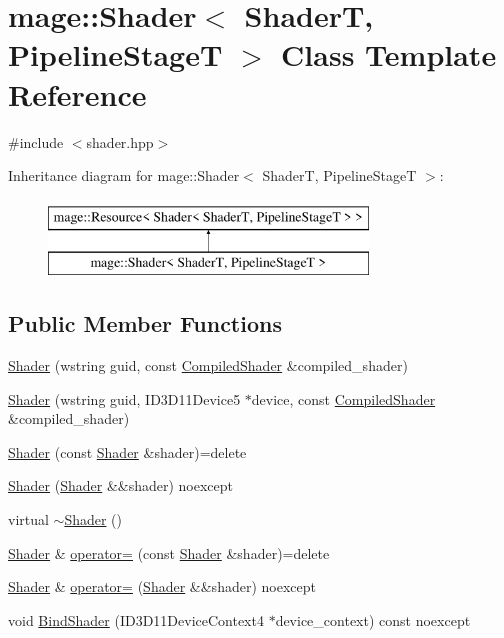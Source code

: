 \hypertarget{classmage_1_1_shader}{}\section{mage\+:\+:Shader$<$ ShaderT, Pipeline\+StageT $>$ Class Template Reference}
\label{classmage_1_1_shader}


{\ttfamily \#include $<$shader.\+hpp$>$}

Inheritance diagram for mage\+:\+:Shader$<$ ShaderT, Pipeline\+StageT $>$\+:\begin{figure}[H]
\begin{center}
\leavevmode
\includegraphics[height=2.000000cm]{classmage_1_1_shader}
\end{center}
\end{figure}
\subsection*{Public Member Functions}
\begin{DoxyCompactItemize}
\item 
\hyperlink{classmage_1_1_shader_a70caa62e6ea79bd63e2d825850c4d6dc}{Shader} (wstring guid, const \hyperlink{classmage_1_1_compiled_shader}{Compiled\+Shader} \&compiled\+\_\+shader)
\item 
\hyperlink{classmage_1_1_shader_a7f8d27e6e1e74e8aca55e854178dd0e5}{Shader} (wstring guid, I\+D3\+D11\+Device5 $\ast$device, const \hyperlink{classmage_1_1_compiled_shader}{Compiled\+Shader} \&compiled\+\_\+shader)
\item 
\hyperlink{classmage_1_1_shader_a22a14b034479acb369c32775bb6a7c09}{Shader} (const \hyperlink{classmage_1_1_shader}{Shader} \&shader)=delete
\item 
\hyperlink{classmage_1_1_shader_a2c4416258ff5d48ac6bc4a0269f20d78}{Shader} (\hyperlink{classmage_1_1_shader}{Shader} \&\&shader) noexcept
\item 
virtual \hyperlink{classmage_1_1_shader_a10a954f75331d93c9549b2db5a2c838e}{$\sim$\+Shader} ()
\item 
\hyperlink{classmage_1_1_shader}{Shader} \& \hyperlink{classmage_1_1_shader_abcb23e3972015f2cc9127e1e4cd4569b}{operator=} (const \hyperlink{classmage_1_1_shader}{Shader} \&shader)=delete
\item 
\hyperlink{classmage_1_1_shader}{Shader} \& \hyperlink{classmage_1_1_shader_acf5ea10f8309e1f71eb2a843480c11a8}{operator=} (\hyperlink{classmage_1_1_shader}{Shader} \&\&shader) noexcept
\item 
void \hyperlink{classmage_1_1_shader_ae21e9f9a4e97d8d73f3988815c1cb205}{Bind\+Shader} (I\+D3\+D11\+Device\+Context4 $\ast$device\+\_\+context) const noexcept
\end{DoxyCompactItemize}
